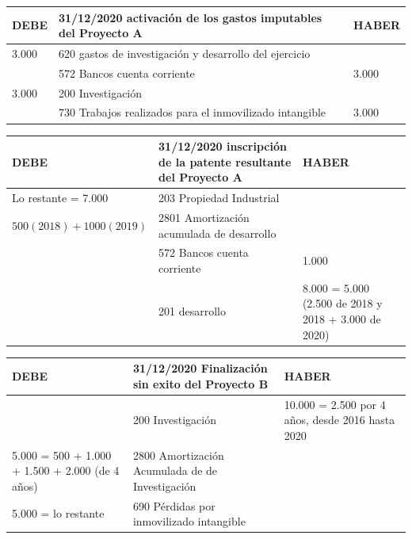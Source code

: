 \documentclass[a4paper,12pt]{article}
\newcommand{\fec}{31/12/}
\newcommand{\bancos}{572 Bancos cuenta corriente}
\newcommand{\perdidasdelintangible}{690 Pérdidas por inmovilizado intangible}
\begin{document}
\begin{table}[H]
    \centering
    \begin{tabular}{|p{3cm}|p{6cm}|p{3cm}|}
    \hline
    \textbf{DEBE} & \textbf{\fec2020 activación de los gastos imputables del Proyecto A} & \textbf{HABER} \\
    \hline
    3.000 & 620 gastos de investigación y desarrollo del ejercicio& \\
    \hline
    & \bancos & 3.000\\
    \hline
    3.000& 200 Investigación& \\
    \hline
    & 730 Trabajos realizados para el inmovilizado intangible&  3.000\\
    \hline
    \end{tabular}
\end{table}

\begin{table}[H]
    \centering
    \begin{tabular}{|p{3cm}|p{6cm}|p{3cm}|}
    \hline
    \textbf{DEBE} & \textbf{\fec2020 inscripción de la patente resultante del Proyecto A} & \textbf{HABER} \\
    \hline
    Lo restante = 7.000& 203 Propiedad Industrial& \\
    \hline
    $500 (2018)+1000(2019)$& 2801 Amortización acumulada de desarrollo& \\
    \hline
    & \bancos & 1.000\\
    \hline
    & 201 desarrollo& 8.000 = 5.000 (2.500 de 2018 y 2018 + 3.000 de 2020)\\
    \hline
    \end{tabular}
\end{table}

\begin{table}[H]
    \centering
    \begin{tabular}{|p{3cm}|p{6cm}|p{3cm}|}
    \hline
    \textbf{DEBE} & \textbf{\fec2020 Finalización sin exito del Proyecto B} & \textbf{HABER} \\
    \hline
    & 200 Investigación& 10.000 = 2.500 por 4 años, desde 2016 hasta 2020\\
    \hline
    5.000 = 500 + 1.000 + 1.500 + 2.000 (de 4 años)& 2800 Amortización Acumulada de de Investigación& \\
    \hline
    5.000 = lo restante& \perdidasdelintangible& \\
    \hline
    \end{tabular}
\end{table}
\end{document}
